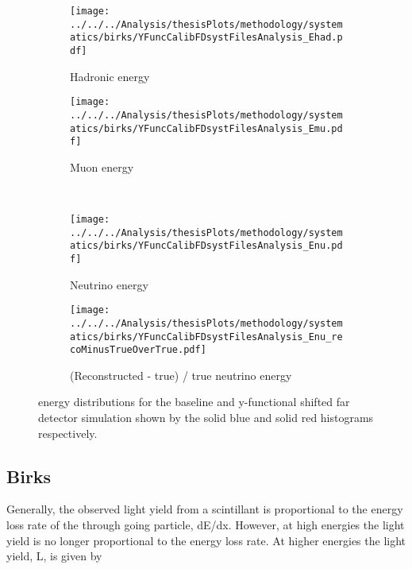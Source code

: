 \begin{figure}%
  \begin{subfigure}{.5\textwidth}
    \centering
    \texttt{[image: ../../../Analysis/thesisPlots/methodology/systematics/birks/YFuncCalibFDsystFilesAnalysis\_Ehad.pdf]}
    \caption{Hadronic energy}
    \label{fig:systsFDY_had}
  \end{subfigure}%
  \begin{subfigure}{.5\textwidth}
    \centering
    \texttt{[image: ../../../Analysis/thesisPlots/methodology/systematics/birks/YFuncCalibFDsystFilesAnalysis\_Emu.pdf]}
    \caption{Muon energy }
    \label{fig:systsFDY_mu}
  \end{subfigure}\\
  \begin{subfigure}{.5\textwidth}
    \centering
    \texttt{[image: ../../../Analysis/thesisPlots/methodology/systematics/birks/YFuncCalibFDsystFilesAnalysis\_Enu.pdf]}
    \caption{Neutrino energy}
    \label{fig:systsFDY_nu}
  \end{subfigure}%
  \begin{subfigure}{.5\textwidth}
    \centering
    \texttt{[image: ../../../Analysis/thesisPlots/methodology/systematics/birks/YFuncCalibFDsystFilesAnalysis\_Enu\_recoMinusTrueOverTrue.pdf]}
    \caption{(Reconstructed  - true) / true neutrino energy }
    \label{fig:systsFDY_rmtot}
  \end{subfigure}
  \caption{energy distributions for the baseline and
    y-functional shifted far detector simulation shown
    by the solid blue and solid red histograms
    respectively. }
  \label{fig:systsFDY}
\end{figure}








\subsection{Birks}\label{sec:birkssysts}

Generally, the observed light yield from a scintillant is proportional
to the energy loss rate of the through going particle, dE/dx. 
However, at high energies the light yield is no longer proportional to
the energy loss rate. 
At higher energies the light yield, L, is given by

